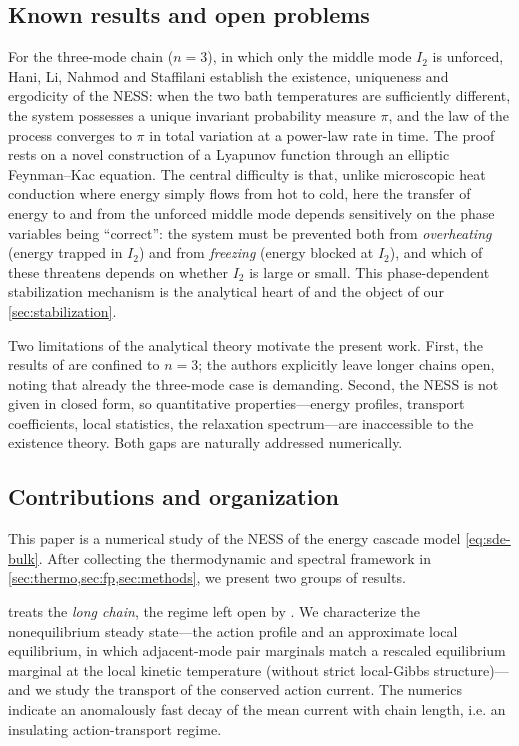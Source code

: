 \documentclass[11pt,a4paper]{article}
\theoremstyle{definition}
\numberwithin{equation}{section}   %
\begin{document}
\subsection{Known results and open problems}\label{sec:known}

For the three-mode chain ($n=3$), in which only the middle mode $I_2$ is
unforced, Hani, Li, Nahmod and Staffilani \cite{HLNS} establish the existence,
uniqueness and ergodicity of the NESS: when the two bath temperatures are
sufficiently different, the system possesses a unique invariant probability
measure $\pi$, and the law of the process converges to $\pi$ in total variation
at a power-law rate in time. The proof rests on a novel construction of a
Lyapunov function through an elliptic Feynman--Kac equation. The central
difficulty is that, unlike microscopic heat conduction where energy simply flows
from hot to cold, here the transfer of energy to and from the unforced middle
mode depends sensitively on the phase variables being ``correct'': the system
must be prevented both from \emph{overheating} (energy trapped in $I_2$) and from
\emph{freezing} (energy blocked at $I_2$), and which of these threatens depends on
whether $I_2$ is large or small. This phase-dependent stabilization mechanism is
the analytical heart of \cite{HLNS} and the object of our \cref{sec:stabilization}.

Two limitations of the analytical theory motivate the present work. First, the
results of \cite{HLNS} are confined to $n=3$; the authors explicitly leave longer
chains open, noting that already the three-mode case is demanding. Second, the
NESS is not given in closed form, so quantitative properties---energy profiles,
transport coefficients, local statistics, the relaxation spectrum---are
inaccessible to the existence theory. Both gaps are naturally addressed
numerically.

\subsection{Contributions and organization}\label{sec:contributions}

This paper is a numerical study of the NESS of the energy cascade model
\eqref{eq:sde-bulk}. After collecting the thermodynamic and spectral framework in
\cref{sec:thermo,sec:fp,sec:methods}, we present two groups of results.

 treats the \emph{long chain}, the regime left open by
\cite{HLNS}. We characterize the nonequilibrium steady state---the action
profile and an approximate local equilibrium, in which adjacent-mode pair
marginals match a rescaled equilibrium marginal at the local kinetic temperature
(without strict local-Gibbs structure)---and we study the transport of the
conserved action current. The numerics indicate an anomalously fast decay of
the mean current with chain length, i.e. an insulating action-transport regime.
\end{document}
